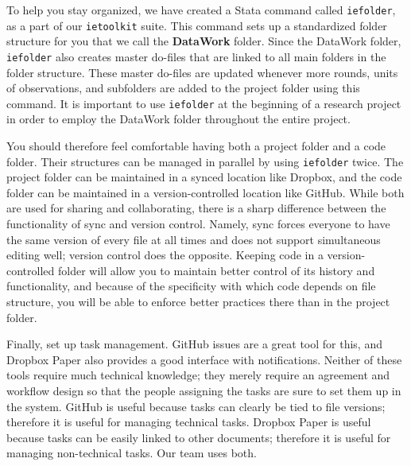 To help you stay organized, we have created a Stata command
called \texttt{iefolder}, as a part of our \texttt{ietoolkit} suite.
This command sets up a standardized folder structure for you that we call the \textbf{DataWork} folder.
Since the DataWork folder, \texttt{iefolder} also creates master do-files
that are linked to all main folders in the folder structure.
These master do-files are updated whenever more rounds, units of observations,
and subfolders are added to the project folder using this command.
It is important to use \texttt{iefolder} at the beginning of a research project
in order to employ the DataWork folder throughout the entire project.

You should therefore feel comfortable having both a project folder and a code folder.
Their structures can be managed in parallel by using \texttt{iefolder} twice.
The project folder can be maintained in a synced location like Dropbox,
and the code folder can be maintained in a version-controlled location like GitHub.
While both are used for sharing and collaborating,
there is a sharp difference between the functionality of sync and version control.
Namely, sync forces everyone to have the same version of every file at all times
and does not support simultaneous editing well; version control does the opposite.
Keeping code in a version-controlled folder will allow you
to maintain better control of its history and functionality,
and because of the specificity with which code depends on file structure,
you will be able to enforce better practices there than in the project folder.

Finally, set up task management. GitHub issues are a great tool for this,
and Dropbox Paper also provides a good interface with notifications.
Neither of these tools require much technical knowledge;
they merely require an agreement and workflow design
so that the people assigning the tasks
are sure to set them up in the system.
GitHub is useful because tasks can clearly be tied to file versions;
therefore it is useful for managing technical tasks.
Dropbox Paper is useful because tasks can be easily linked to other documents;
therefore it is useful for managing non-technical tasks.
Our team uses both.
